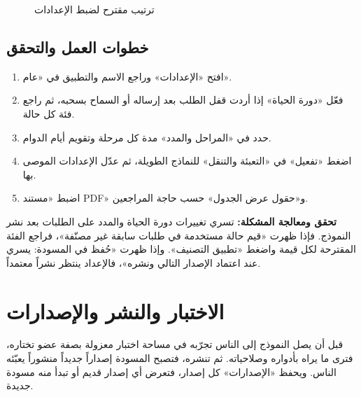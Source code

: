 \begin{figure}[H]
\centering
{}
\rclegend
\caption{ترتيب مقترح لضبط الإعدادات}
\label{fig:builder-forms-settings-flow}
\end{figure}

\subsection{خطوات العمل والتحقق}
\begin{enumerate}
\item افتح «الإعدادات» وراجع الاسم والتطبيق في «عام».
\item فعّل «دورة الحياة» إذا أردت قفل الطلب بعد إرساله أو السماح بسحبه، ثم راجع فئة كل حالة.
\item حدد في «المراحل والمدد» مدة كل مرحلة وتقويم أيام الدوام.
\item اضغط «تفعيل» في «التعبئة والتنقل» للنماذج الطويلة، ثم عدّل الإعدادات الموصى بها.
\item اضبط «مستند PDF» و«حقول عرض الجدول» حسب حاجة المراجعين.
\end{enumerate}

\textbf{تحقق ومعالجة المشكلة:} تسري تغييرات دورة الحياة والمدد على الطلبات بعد نشر النموذج. فإذا ظهرت «قيم حالة مستخدمة في طلبات سابقة غير مصنّفة»، فراجع الفئة المقترحة لكل قيمة واضغط «تطبيق التصنيف». وإذا ظهرت «حُفظ في المسودة: يسري عند اعتماد الإصدار التالي ونشره»، فالإعداد ينتظر نشراً معتمداً.

\clearpage
\section{الاختبار والنشر والإصدارات}
\label{sec:builder-feature-forms-test-publish}

قبل أن يصل النموذج إلى الناس تجرّبه في مساحة اختبار معزولة بصفة عضو تختاره، فترى ما يراه بأدواره وصلاحياته. ثم تنشره، فتصبح المسودة إصداراً جديداً منشوراً يعبّئه الناس. ويحفظ «الإصدارات» كل إصدار، فتعرض أي إصدار قديم أو تبدأ منه مسودة جديدة.

